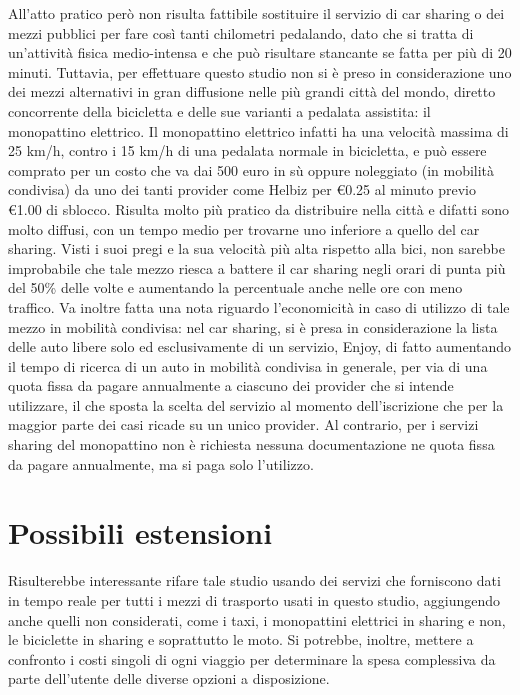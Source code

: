 All'atto pratico però non risulta fattibile sostituire il servizio di car sharing o dei mezzi pubblici per fare così tanti chilometri pedalando, dato che si tratta di un'attività fisica medio-intensa e che può risultare stancante se fatta per più di 20 minuti. Tuttavia, per effettuare questo studio non si è preso in considerazione uno dei mezzi alternativi in gran diffusione nelle più grandi città del mondo, diretto concorrente della bicicletta e delle sue varianti a pedalata assistita: il monopattino elettrico.
Il monopattino elettrico infatti ha una velocità massima di 25 km/h, contro i 15 km/h di una pedalata normale in bicicletta, e può essere comprato per un costo che va dai 500 euro in sù oppure noleggiato (in mobilità condivisa) da uno dei tanti provider come Helbiz per €0.25 al minuto previo €1.00 di sblocco. Risulta molto più pratico da distribuire nella città e difatti sono molto diffusi, con un tempo medio per trovarne uno inferiore a quello del car sharing. Visti i suoi pregi e la sua velocità più alta rispetto alla bici, non sarebbe improbabile che tale mezzo riesca a battere il car sharing negli orari di punta più del 50\% delle volte e aumentando la percentuale anche nelle ore con meno traffico. Va inoltre fatta una nota riguardo l'economicità in caso di utilizzo di tale mezzo in mobilità condivisa: nel car sharing, si è presa in considerazione la lista delle auto libere solo ed esclusivamente di un servizio, Enjoy, di fatto aumentando il tempo di ricerca di un auto in mobilità condivisa in generale, per via di una quota fissa da pagare annualmente a ciascuno dei provider che si intende utilizzare, il che sposta la scelta del servizio al momento dell'iscrizione che per la maggior parte dei casi ricade su un unico provider. Al contrario, per i servizi sharing del monopattino non è richiesta nessuna documentazione ne quota fissa da pagare annualmente, ma si paga solo l'utilizzo.

\section{Possibili estensioni}

Risulterebbe interessante rifare tale studio usando dei servizi che forniscono dati in tempo reale per tutti i mezzi di trasporto usati in questo studio, aggiungendo anche quelli non considerati, come i taxi, i monopattini elettrici in sharing e non, le biciclette in sharing e soprattutto le moto. Si potrebbe, inoltre, mettere a confronto i costi singoli di ogni viaggio per determinare la spesa complessiva da parte dell'utente delle diverse opzioni a disposizione.

